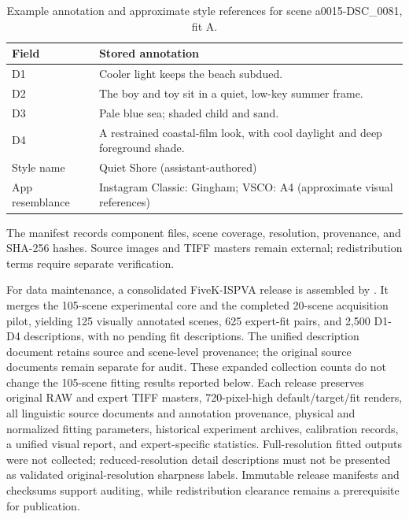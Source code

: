 \documentclass[journal]{IEEEtran}
\begin{document}
\begin{table}[t]
\caption{Example annotation and approximate style references for scene a0015-DSC\_0081, fit A.}
\label{tab:annotation-example}
\centering
\footnotesize
\begin{tabularx}{\columnwidth}{l X}
\toprule
Field & Stored annotation \\
\midrule
D1 & Cooler light keeps the beach subdued. \\
D2 & The boy and toy sit in a quiet, low-key summer frame. \\
D3 & Pale blue sea; shaded child and sand. \\
D4 & A restrained coastal-film look, with cool daylight and deep foreground shade. \\
Style name & Quiet Shore (assistant-authored) \\
App resemblance & Instagram Classic: Gingham; VSCO: A4 (approximate visual references) \\
\bottomrule
\end{tabularx}
\end{table}

The manifest  records component files, scene coverage, resolution, provenance, and SHA-256 hashes. Source images and TIFF masters remain external; redistribution terms require separate verification.

For data maintenance, a consolidated FiveK-ISPVA release is assembled by . It merges the 105-scene experimental core and the completed 20-scene acquisition pilot, yielding 125 visually annotated scenes, 625 expert-fit pairs, and 2,500 D1-D4 descriptions, with no pending fit descriptions. The unified description document retains source and scene-level provenance; the original source documents remain separate for audit. These expanded collection counts do not change the 105-scene fitting results reported below. Each release preserves original RAW and expert TIFF masters, 720-pixel-high default/target/fit renders, all linguistic source documents and annotation provenance, physical and normalized fitting parameters, historical experiment archives, calibration records, a unified visual report, and expert-specific statistics. Full-resolution fitted outputs were not collected; reduced-resolution detail descriptions must not be presented as validated original-resolution sharpness labels. Immutable release manifests and checksums support auditing, while redistribution clearance remains a prerequisite for publication.
\end{document}
